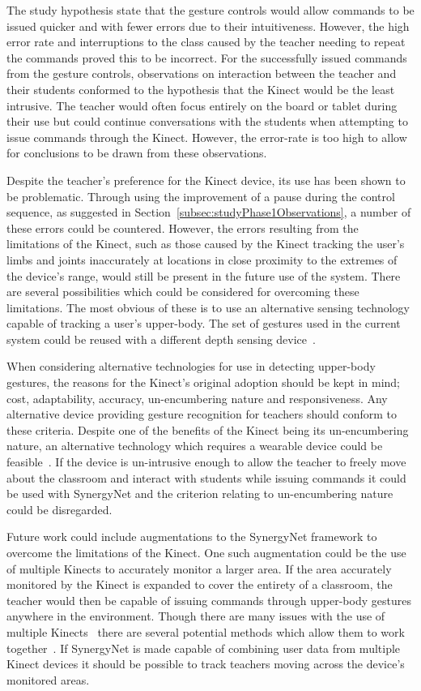 \documentclass[link]{IWCOMP}
\begin{document}
The study hypothesis state that the gesture controls would allow commands to be issued quicker and with fewer errors due to their intuitiveness.
However, the high error rate and interruptions to the class caused by the teacher needing to repeat the commands proved this to be incorrect.
For the successfully issued commands from the gesture controls, observations on interaction between the teacher and their students conformed to the hypothesis that the Kinect would be the least intrusive.
The teacher would often focus entirely on the board or tablet during their use but could continue conversations with the students when attempting to issue commands through the Kinect.
However, the error-rate is too high to allow for conclusions to be drawn from these observations.

Despite the teacher's preference for the Kinect device, its use has been shown to be problematic.
Through using the improvement of a pause during the control sequence, as suggested in Section~\ref{subsec:studyPhase1Observations}, a number of these errors could be countered.
However, the errors resulting from the limitations of the Kinect, such as those caused by the Kinect tracking the user's limbs and joints inaccurately at locations in close proximity to the extremes of the device's range, would still be present in the future use of the system.
There are several possibilities which could be considered for overcoming these limitations.
The most obvious of these is to use an alternative sensing technology capable of tracking a user's upper-body.
The set of gestures used in the current system could be reused with a different depth sensing device~\cite{Kean2011}.

When considering alternative technologies for use in detecting upper-body gestures, the reasons for the Kinect's original adoption should be kept in mind; cost, adaptability, accuracy, un-encumbering nature and responsiveness.
Any alternative device providing gesture recognition for teachers should conform to these criteria.
Despite one of the benefits of the Kinect being its un-encumbering nature, an alternative technology which requires a wearable device could be feasible~\cite{Rekimotoa,Zhu2011}.
If the device is un-intrusive enough to allow the teacher to freely move about the classroom and interact with students while issuing commands it could be used with SynergyNet and the criterion relating to un-encumbering nature could be disregarded. 

Future work could include augmentations to the SynergyNet framework to overcome the limitations of the Kinect.
One such augmentation could be the use of multiple Kinects to accurately monitor a larger area.
If the area accurately monitored by the Kinect is expanded to cover the entirety of a classroom, the teacher would then be capable of issuing commands through upper-body gestures anywhere in the environment.
Though there are many issues with the use of multiple Kinects~\cite{Maimone2012,Schroder2011} there are several potential methods which allow them to work together~\cite{Wang2012}.
If SynergyNet is made capable of combining user data from multiple Kinect devices it should be possible to track teachers moving across the device's monitored areas.
\end{document}
